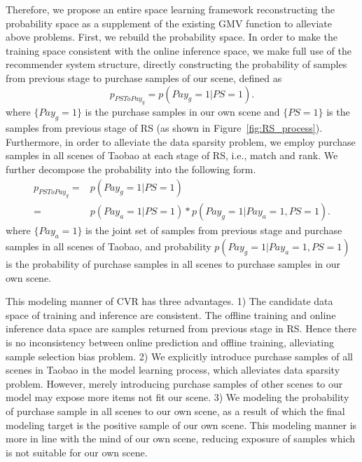 \documentclass[sigconf]{acmart}
\begin{document}
Therefore, we propose an entire space learning framework 
reconstructing the probability space as a supplement of the existing GMV function to alleviate above problems. 
First, we rebuild the probability space. In order to make the training space consistent with the online inference space, we make full use of the recommender system structure, directly constructing the probability of samples from previous stage to purchase samples of our scene, defined as 
\begin{equation}
    p_{PSToPay_{g}} = p(Pay_{g}=1|PS=1).
\end{equation}
where $\{Pay_{g}=1\}$ is the purchase samples in our own scene and $\{PS=1\}$ is the samples from previous stage of RS (as shown in Figure~\ref{fig:RS_process}). Furthermore, in order to alleviate the data sparsity problem, we employ purchase samples in all scenes of Taobao at each stage of RS, i.e., match and rank. We further decompose the probability into the following form.
\begin{equation}
\begin{aligned}
    p_{PSToPay_{g}} = & p(Pay_{g}=1|PS=1) \\
                = & p(Pay_{a}=1|PS=1) *  p(Pay_{g}=1|Pay_{a}=1, PS=1).
\end{aligned}
\end{equation}
where $\{Pay_{a}=1\}$ is the joint set of samples from previous stage and purchase samples in all scenes of Taobao, and probability ${p(Pay_{g}=1|Pay_{a}=1, PS=1)}$ is the probability of purchase samples in all scenes to purchase samples in our own scene. 

This modeling manner of CVR has three advantages. 1) The candidate data space of training and inference are consistent. The offline training and online inference data space are samples returned from previous stage in RS. Hence there is no inconsistency between online prediction and offline training, alleviating sample selection bias problem. 2) We explicitly introduce purchase samples of all scenes in Taobao in the model learning process, which alleviates data sparsity problem. However, merely introducing purchase samples of other scenes to our model may expose more items not fit our scene. 3) We modeling the probability of purchase sample in all scenes to our own scene, as a result of which the final modeling target is the positive sample of our own scene. This modeling manner is more in line with the mind of our own scene, reducing exposure of samples which is not suitable for our own scene.
\end{document}
